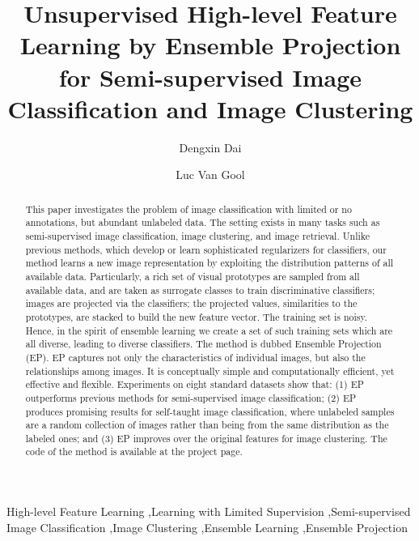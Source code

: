 \documentclass[preprint,12pt,3p]{elsarticle}
\begin{document}
\begin{frontmatter}

\title{Unsupervised High-level Feature Learning by Ensemble Projection for Semi-supervised Image Classification and Image Clustering
 }


\author{Dengxin Dai}

\author{Luc Van Gool}

\address{Computer Vision Lab, ETH Z\"urich, CH-8092, Switzerland}

\begin{abstract}
 This paper investigates the problem of image classification with limited or no annotations, but
 abundant unlabeled data. 
The setting exists in many tasks such as semi-supervised image classification, image clustering, and image retrieval.
Unlike previous methods, which develop or learn sophisticated regularizers for classifiers, our method learns a new
  image representation 
  by exploiting the distribution patterns of all available data. Particularly, a rich set of visual prototypes are sampled
  from all available data, and are taken as surrogate classes to train
  discriminative classifiers; images are projected  via
  the classifiers; the projected values, similarities to the
  prototypes, are stacked to build the new feature vector. The training
  set is noisy. Hence, in the spirit of ensemble learning we
  create a set of such training sets which are all diverse, leading to
 diverse classifiers. The method is dubbed Ensemble
  Projection (EP).  EP captures not only the characteristics of
  individual images, but also the relationships among images. It is
  conceptually simple and computationally efficient, yet effective and
  flexible.  Experiments on eight standard datasets show that: (1) EP
  outperforms previous methods for semi-supervised image
  classification; (2) EP produces promising results for self-taught
  image classification, where unlabeled samples are a random
  collection of images rather than being from the same distribution as
 the labeled ones; and (3) EP improves over the original features for
  image clustering. The code of the method is available at the project page.
\end{abstract}

\begin{keyword}
 High-level Feature Learning \sep Learning with Limited Supervision \sep Semi-supervised Image Classification \sep Image Clustering
     \sep Ensemble Learning \sep Ensemble Projection
\end{keyword}

\end{frontmatter}
\end{document}
